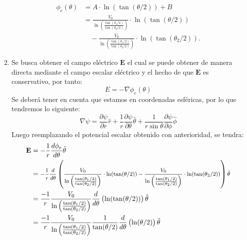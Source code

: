 \documentclass[
  11pt,
  letterpaper,
   addpoints,
   answers
  ]{exam}
\begin{document}
\begin{questions}
\begin{solution}
\begin{enumerate}
        \begin{equation}
            \begin{aligned}
                \phi_{e}(\theta) &= A\cdot \ln\left(\tan(\theta/2)\right) + B \\
                &= \frac{V_{0}}{\ln\left(\frac{\tan(\theta_{1}/2)}{\tan(\theta_{2}/2)}\right)} \cdot \ln\left(\tan(\theta/2)\right) \\
                &\quad - \frac{V_{0}}{\ln\left(\frac{\tan(\theta_{1}/2)}{\tan(\theta_{2}/2)}\right)} \cdot \ln\left(\tan(\theta_{2}/2)\right).
            \end{aligned}
        \end{equation}
    \item Se busca obtener el campo eléctrico $\textbf{E}$ el cual se puede obtener de manera directa mediante el campo escalar eléctrico y el hecho de que $\textbf{E}$ es conservativo, por tanto:
    \begin{equation}
        E= - \nabla \phi_{e}(\theta)
    \end{equation}
    Se deberá tener en cuenta que estamos en coordenadas esféricas, por lo que tendremos lo siguiente:
    \begin{equation}
        \nabla \psi = \frac{\partial \psi}{\partial r} \hat{r} + \frac{1}{r} \frac{\partial \psi}{\partial \theta} \hat{\theta} + \frac{1}{r \sin \theta} \frac{\partial \psi}{\partial \phi} \hat{\phi}
    \end{equation}
    Luego reemplazando el potencial escalar obtenido con anterioridad, se tendra:
    \begin{equation}
        \begin{aligned}
            \textbf{E} &= -\frac{1}{r}\frac{d\phi_{e}}{d\theta} \hat{\theta} \\
                       &= \text{\footnotesize$-\frac{1}{r} \frac{d}{d\theta}\left( \frac{V_{0}}{\ln\left(\frac{\tan(\theta_{1}/2)}{\tan(\theta_{2}/2)}\right)} \cdot \ln(\tan(\theta/2)) -\frac{V_{0}}{\ln\left(\frac{\tan(\theta_{1}/2)}{\tan(\theta_{2}/2)}\right)} \cdot \ln(\tan(\theta_{2}/2))\right) \hat{\theta}$} \\
                       &= \frac{-1}{r} \frac{V_{0}}{\ln\left(\frac{\tan(\theta_{1}/2)}{\tan(\theta_{2}/2)}\right)}  \frac{d}{d\theta} \left( \ln(\tan(\theta/2)) \right) \hat{\theta} \\
                       &=\frac{-1}{r} \frac{V_{0}}{\ln\left(\frac{\tan(\theta_{1}/2)}{\tan(\theta_{2}/2)}\right)} \frac{1}{\tan(\theta/2)} \frac{d}{d\theta}\left(\ln(\theta/2)\right)\hat{\theta} \\

\end{aligned}
\end{equation}
\end{enumerate}
\end{solution}
\end{questions}
\end{document}
